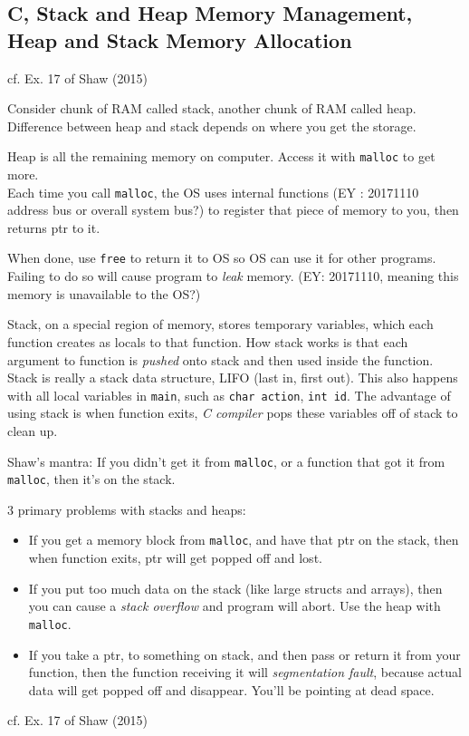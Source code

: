 \documentclass[10pt]{amsart}
\begin{document}
\begin{multicols*}{2}
\section{C, Stack and Heap Memory Management, Heap and Stack Memory Allocation}  

cf. Ex. 17 of Shaw (2015) \cite{Shaw2015}

Consider chunk of RAM called stack, another chunk of RAM called heap.  Difference between heap and stack depends on where you get the storage.  

Heap is all the remaining memory on computer.  Access it with \verb|malloc| to get more.  \\
Each time you call \verb|malloc|, the OS uses internal functions (EY : 20171110 address bus or overall system bus?) to register that piece of memory to you, then returns ptr to it.  

When done, use \verb|free| to return it to OS so OS can use it for other programs.  Failing to do so will cause program to \emph{leak} memory.  (EY: 20171110, meaning this memory is unavailable to the OS?)

Stack, on a special region of memory, stores temporary variables, which each function creates as locals to that function.  How stack works is that each argument to function is \emph{pushed} onto stack and then used inside the function.  Stack is really a stack data structure, LIFO (last in, first out).  This also happens with all local variables in \verb|main|, such as \verb|char action|, \verb|int id|.  The advantage of using stack is when function exits, \emph{C compiler} pops these variables off of stack to clean up.  

Shaw's mantra: If you didn't get it from \verb|malloc|, or a function that got it from \verb|malloc|, then it's on the stack.  

3 primary problems with stacks and heaps: 
\begin{itemize}
	\item If you get a memory block from \verb|malloc|, and have that ptr on the stack, then when function exits, ptr will get popped off and lost.  
	\item If you put too much data on the stack (like large structs and arrays), then you can cause a \emph{stack overflow} and program will abort.  Use the heap with \verb|malloc|.  
	\item If you take a ptr, to something on stack, and then pass or return it from your function, then the function receiving it will \emph{segmentation fault}, because actual data will get popped off and disappear.  You'll be pointing at dead space.  
\end{itemize}
cf. Ex. 17 of Shaw (2015) \cite{Shaw2015}






\end{multicols*}
\end{document}
